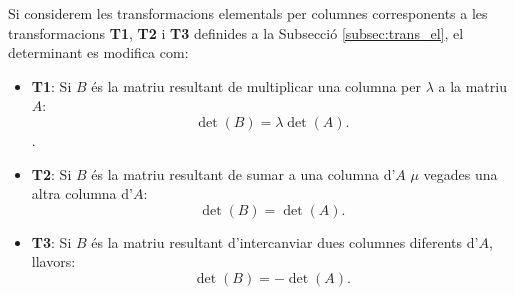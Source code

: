 \begin{lema}\label{lema:det_i_trans_elem}
Si considerem les transformacions elementals per columnes corresponents a les transformacions \textbf{T1}, \textbf{T2} i \textbf{T3} definides a la Subsecció \ref{subsec:trans_el}, el determinant es modifica com:
\begin{itemize}
    \item \textbf{T1}: Si $B$ és la matriu resultant de multiplicar una columna per $\lambda$ a la matriu $A$:
    $$
    \det(B)=\lambda \det(A).
    $$.
    \item \textbf{T2}: Si $B$ és la matriu resultant de sumar a una columna d'$A$ $\mu$ vegades una altra columna d'$A$:
    $$
    \det(B)=\det(A).
    $$
    \item \textbf{T3}: Si $B$ és la matriu resultant d'intercanviar dues columnes diferents d'$A$, llavors:
    $$
    \det(B)=-\det(A).
    $$
\end{itemize}
\end{lema}
